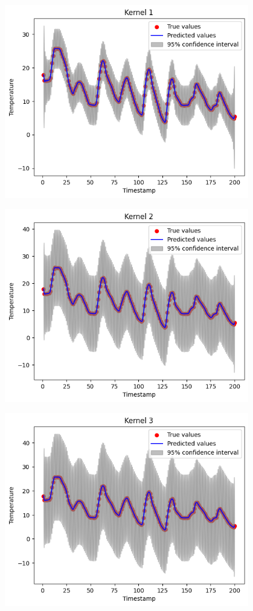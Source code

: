 \documentclass[12pt]{article}
\begin{document}
\begin{center}
    \includegraphics[width=0.8\textwidth]{img/kernel1.png}
\end{center}

\begin{center}
    \includegraphics[width=0.8\textwidth]{img/kernel2.png}
\end{center}

\begin{center}
    \includegraphics[width=0.8\textwidth]{img/kernel3.png}
\end{center}
\end{document}
